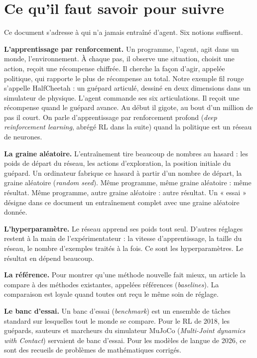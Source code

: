\documentclass[11pt,a4paper]{article}
\begin{document}
\section{Ce qu'il faut savoir pour
suivre}\label{ce-quil-faut-savoir-pour-suivre}

Ce document s'adresse à qui n'a jamais entraîné d'agent. Six notions
suffisent.

\textbf{L'apprentissage par renforcement.} Un programme, l'agent, agit
dans un monde, l'environnement. À chaque pas, il observe une situation,
choisit une action, reçoit une récompense chiffrée. Il cherche la façon
d'agir, appelée politique, qui rapporte le plus de récompense au total.
Notre exemple fil rouge s'appelle HalfCheetah : un guépard articulé,
dessiné en deux dimensions dans un simulateur de physique. L'agent
commande ses six articulations. Il reçoit une récompense quand le
guépard avance. Au début il gigote, au bout d'un million de pas il
court. On parle d'apprentissage par renforcement profond (\emph{deep
reinforcement learning}, abrégé RL dans la suite) quand la politique est
un réseau de neurones.

\textbf{La graine aléatoire.} L'entraînement tire beaucoup de nombres au
hasard : les poids de départ du réseau, les actions d'exploration, la
position initiale du guépard. Un ordinateur fabrique ce hasard à partir
d'un nombre de départ, la graine aléatoire (\emph{random seed}). Même
programme, même graine aléatoire : même résultat. Même programme, autre
graine aléatoire : autre résultat. Un « essai » désigne dans ce document
un entraînement complet avec une graine aléatoire donnée.

\textbf{L'hyperparamètre.} Le réseau apprend ses poids tout seul.
D'autres réglages restent à la main de l'expérimentateur : la vitesse
d'apprentissage, la taille du réseau, le nombre d'exemples traités à la
fois. Ce sont les hyperparamètres. Le résultat en dépend beaucoup.

\textbf{La référence.} Pour montrer qu'une méthode nouvelle fait mieux,
un article la compare à des méthodes existantes, appelées références
(\emph{baselines}). La comparaison est loyale quand toutes ont reçu le
même soin de réglage.

\textbf{Le banc d'essai.} Un banc d'essai (\emph{benchmark}) est un
ensemble de tâches standard sur lesquelles tout le monde se compare.
Pour le RL de 2018, les guépards, sauteurs et marcheurs du simulateur
MuJoCo (\emph{Multi-Joint dynamics with Contact})
\autocite{todorov2012mujoco} servaient de banc d'essai. Pour les modèles
de langue de 2026, ce sont des recueils de problèmes de mathématiques
corrigés.
\end{document}
